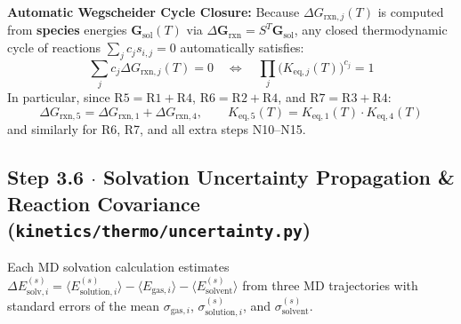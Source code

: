 \documentclass[11pt,a4paper]{article}
\begin{document}
\textbf{Automatic Wegscheider Cycle Closure:} Because $\Delta G_{\text{rxn}, j}(T)$ is computed from \textbf{species} energies $\mathbf{G}_{\text{sol}}(T)$ via $\Delta \mathbf{G}_{\text{rxn}} = S^T \mathbf{G}_{\text{sol}}$, any closed thermodynamic cycle of reactions $\sum_j c_j s_{i,j} = 0$ automatically satisfies:
\begin{equation}
\sum_j c_j \Delta G_{\text{rxn}, j}(T) = 0 \quad \Longleftrightarrow \quad \prod_j \big(K_{\text{eq}, j}(T)\big)^{c_j} = 1
\end{equation}
In particular, since $\text{R5} = \text{R1} + \text{R4}$, $\text{R6} = \text{R2} + \text{R4}$, and $\text{R7} = \text{R3} + \text{R4}$:
\begin{equation}
\Delta G_{\text{rxn}, 5} = \Delta G_{\text{rxn}, 1} + \Delta G_{\text{rxn}, 4}, \qquad K_{\text{eq}, 5}(T) = K_{\text{eq}, 1}(T) \cdot K_{\text{eq}, 4}(T)
\end{equation}
and similarly for R6, R7, and all extra steps N10--N15.

\subsection*{Step 3.6 $\cdot$ Solvation Uncertainty Propagation \& Reaction Covariance (\texttt{kinetics/\allowbreak{}thermo/\allowbreak{}uncertainty.py})}

Each MD solvation calculation estimates $\Delta E_{\text{solv}, i}^{(s)} = \langle E_{\text{solution}, i}^{(s)} \rangle - \langle E_{\text{gas}, i} \rangle - \langle E_{\text{solvent}}^{(s)} \rangle$ from three MD trajectories with standard errors of the mean $\sigma_{\text{gas}, i}$, $\sigma_{\text{solution}, i}^{(s)}$, and $\sigma_{\text{solvent}}^{(s)}$.
\end{document}
